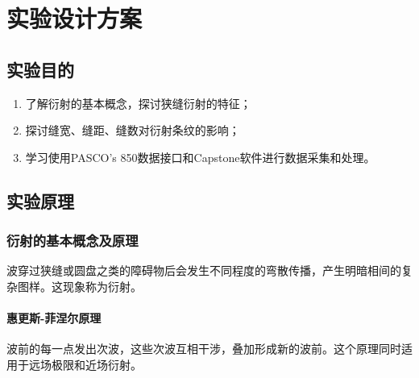 \documentclass[a4paper]{../phyreport}
\begin{document}
\phyExpCover{}
\section{实验设计方案}
\subsection{实验目的}

\begin{enumerate}
  \item 了解衍射的基本概念，探讨狭缝衍射的特征；
  \item 探讨缝宽、缝距、缝数对衍射条纹的影响；
  \item 学习使用PASCO's 850数据接口和Capstone软件进行数据采集和处理。
\end{enumerate}

\subsection{实验原理}
\subsubsection{衍射的基本概念及原理}

波穿过狭缝或圆盘之类的障碍物后会发生不同程度的弯散传播，产生明暗相间的复杂图样。这现象称为衍射。

\paragraph{惠更斯-菲涅尔原理}
波前的每一点发出次波，这些次波互相干涉，叠加形成新的波前。这个原理同时适用于远场极限和近场衍射。
\end{document}
